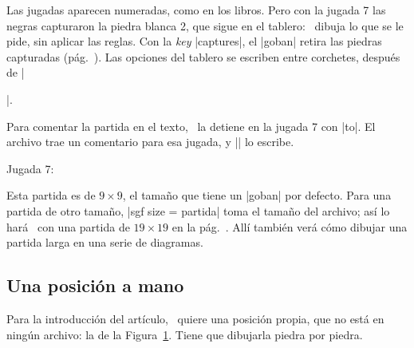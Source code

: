 Las jugadas aparecen numeradas, como en los libros. Pero con la jugada 7 las negras capturaron la piedra blanca 2, que sigue en el tablero: \pgfgoname\ dibuja lo que se le pide, sin aplicar las reglas. Con la \emph{key} |captures|, el |goban| retira las piedras capturadas (pág.~\pageref{subsec:capturas}). Las opciones del tablero se escriben entre corchetes, después de |\begin{goban}|.

\begin{codeexample}[width=4.8cm]
\begin{goban}[captures]
\end{goban}
\end{codeexample}

Para comentar la partida en el texto, \karu\ la detiene en la jugada 7 con |to|. El archivo trae un comentario para esa jugada, y |\sgfcomment| lo escribe.

\begin{codeexample}[width=4.8cm]
\begin{goban}[captures]
\end{goban}

Jugada 7: 
\end{codeexample}

Esta partida es de $9\times9$, el tamaño que tiene un |goban| por defecto. Para una partida de otro tamaño, |sgf size = partida| toma el tamaño del archivo; así lo hará \karu\ con una partida de $19\times19$ en la pág.~\pageref{tut:partida}. Allí también verá cómo dibujar una partida larga en una serie de diagramas.

\subsection{Una posición a mano}
\label{tut:posicion}

Para la introducción del artículo, \karu\ quiere una posición propia, que no está en ningún archivo: la de la Figura~\ref{fig:primer-ejemplo}. Tiene que dibujarla piedra por piedra.

\begin{figure}[H]
	\centering
	\begin{goban}[label = {at = {north, west}}]
	\end{goban}
	\caption{}
	\label{fig:primer-ejemplo}
\end{figure}


\end{goban}
